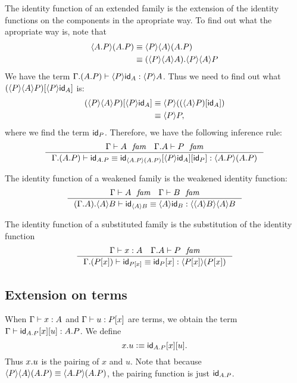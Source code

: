 The identity function of an extended family is the extension of the identity
functions on the components in the apropriate way. To find out what the
apropriate way is, note that
\begin{align*}
\ctxwk{\ctxext{A}{P}}{\ctxext{A}{P}} & \jdeq \ctxwk{P}{{A}{\ctxext{A}{P}}}\\
& \jdeq \ctxext{\ctxwk{P}{{A}{A}}}{\ctxwk{P}{{A}{P}}}
\end{align*}
We have the term $\jterm{\ctxext{\Gamma}{{A}{P}}}{\ctxwk{P}{A}}{\ctxwk{P}{\idfunc[A]}}$.
Thus we need to find out what $\subst{\ctxwk{P}{\idfunc[A]}}{\ctxwk{P}{{A}{P}}}$ is:
\begin{align*}
\subst{\ctxwk{P}{\idfunc[A]}}{\ctxwk{P}{{A}{P}}} & \jdeq \ctxwk{P}{\subst{\idfunc[A]}{\ctxwk{A}{P}}}\\
& \jdeq \ctxwk{P}{P},
\end{align*}
where we find the term $\idfunc[P]$. Therefore, we have the following inference rule:
\begin{equation}\label{idfunc-ext-comp}
\inference{\jfam{\Gamma}{A}\quad\jfam{\ctxext{\Gamma}{A}}{P}}{\jtermeq{\ctxext{\Gamma}{{A}{P}}}{\ctxwk{\ctxext{A}{P}}{\ctxext{A}{P}}}{\idfunc[\ctxext{A}{P}]}{\subst{\idfunc[P]}{{\ctxwk{P}{\idfunc[A]}}{\idfunc[\ctxwk{\ctxext{A}{P}}{\ctxext{A}{P}}]}}}}
\end{equation}

The identity function of a weakened family is the weakened identity function:
\begin{equation}\label{idfunc-wk-comp}
\inference{\jfam{\Gamma}{A}\quad\jfam{\Gamma}{B}}{\jtermeq{\ctxext{{\Gamma}{A}}{\ctxwk{A}{B}}}{\ctxwk{{A}{B}}{{A}{B}}}{\idfunc[\ctxwk{A}{B}]}{\ctxwk{A}{\idfunc[B]}}}
\end{equation}

The identity function of a substituted family is the substitution of the identity function
\begin{equation}\label{idfunc-subst-comp}
\inference{\jterm{\Gamma}{A}{x}\quad\jfam{\ctxext{\Gamma}{A}}{P}}{\jtermeq{\ctxext{\Gamma}{\subst{x}{P}}}{\ctxwk{\subst{x}{P}}{\subst{x}{P}}}{\idfunc[\subst{x}{P}]}{\subst{x}{\idfunc[P]}}}
\end{equation}

\subsection{Extension on terms}\label{extension-on-terms}
When $\jterm{\Gamma}{A}{x}$ and $\jterm{\Gamma}{\subst{x}{P}}{u}$ are terms,
we obtain the term $\jterm{\Gamma}{\ctxext{A}{P}}{\subst{u}{{x}{\idfunc[\ctxext{A}{P}]}}}$. 
We define 
\begin{equation*}
\ctxext{x}{u}\defeq\subst{u}{{x}{\idfunc[\ctxext{A}{P}]}}.
\end{equation*}
Thus
$\ctxext{x}{u}$ is the pairing of $x$ and $u$. Note that because
$\ctxwk{P}{{A}{\ctxext{A}{P}}}\jdeq\ctxwk{\ctxext{A}{P}}{\ctxext{A}{P}}$, the
pairing function is just $\idfunc[\ctxext{A}{P}]$. 

